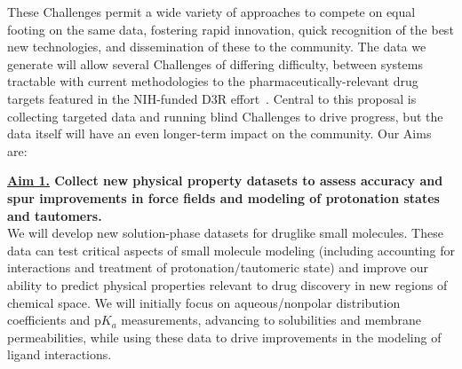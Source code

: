 \documentclass[11pt]{article}
\begin{document}
These Challenges permit a wide variety of approaches to compete on equal footing on the same data, fostering rapid innovation, quick recognition of the best new technologies, and dissemination of these to the community. 
The data we generate will allow several Challenges of differing difficulty, between systems tractable with current methodologies to the pharmaceutically-relevant drug targets featured in the NIH-funded D3R effort~\cite{Gathiaka:2016:JComputAidedMolDes}.
Central to this proposal is collecting targeted data and running blind Challenges to drive progress, but the data itself will have an even longer-term impact on the community.
Our Aims are:


{\bf \underline{Aim 1.} Collect new physical property datasets to assess accuracy and spur improvements in force fields and modeling of protonation states and tautomers.}\\
We will develop new solution-phase datasets for druglike small molecules. 
These data can test critical aspects of small molecule modeling (including accounting for interactions and treatment of protonation/tautomeric state) and improve our ability to predict physical properties relevant to drug discovery in new regions of chemical space. 
We will initially focus on aqueous/nonpolar distribution coefficients and p$K_a$ measurements, advancing to solubilities and membrane permeabilities, while using these data to drive improvements in the modeling of ligand interactions.
\end{document}
